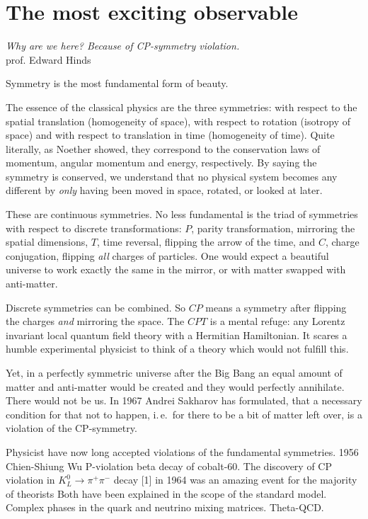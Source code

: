 \chapter{The most exciting observable}
\label{ch:nedm-at-psi}

\begin{center}
  \emph{Why are we here? Because of CP-symmetry violation.}\\
  prof. Edward Hinds
\end{center}

Symmetry is the most fundamental form of beauty.

The essence of the classical physics are the three symmetries: with respect to the spatial translation (homogeneity of space), with respect to rotation (isotropy of space) and with respect to translation in time (homogeneity of time). Quite literally, as Noether showed, they correspond to the conservation laws of momentum, angular momentum and energy, respectively. By saying the symmetry is conserved, we understand that no physical system becomes any different by \emph{only} having been moved in space, rotated, or looked at later.

These are continuous symmetries. No less fundamental is the triad of symmetries with respect to discrete transformations: $P$, parity transformation, mirroring the spatial dimensions, $T$, time reversal, flipping the arrow of the time, and $C$, charge conjugation, flipping \emph{all} charges of particles. One would expect a beautiful universe to work exactly the same in the mirror, or with matter swapped with anti-matter.

Discrete symmetries can be combined. So $CP$ means a symmetry after flipping the charges \emph{and} mirroring the space. The $CPT$ is a mental refuge: any Lorentz invariant local quantum field theory with a Hermitian Hamiltonian. It scares a humble experimental physicist to think of a theory which would not fulfill this.

Yet, in a perfectly symmetric universe after the Big Bang an equal amount of matter and anti-matter would be created and they would perfectly annihilate. There would not be us.
In 1967 Andrei Sakharov
has formulated, that a necessary condition for that not to happen, i.\,e.\ for there to be a bit of matter left over, is a violation of the CP-symmetry.

Physicist have now long accepted violations of the fundamental symmetries.
1956 Chien-Shiung Wu P-violation beta decay of cobalt-60. 
The discovery of CP violation in $K^0_L \rightarrow \pi^+ \pi^-$ decay [1] in 1964 was an amazing event for the majority of theorists
Both have been explained in the scope of the standard model. Complex phases in the quark and neutrino mixing matrices. Theta-QCD.


